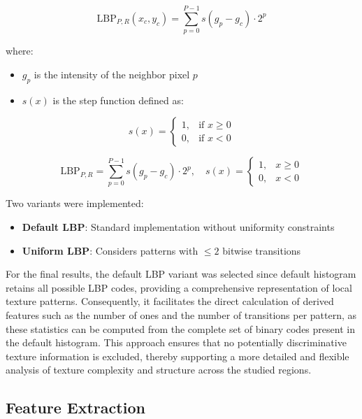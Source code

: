 \documentclass[a4paper,12pt]{report}
\begin{document}
\begin{equation}
\text{LBP}_{P,R}(x_c, y_c) = \sum_{p=0}^{P-1} s(g_p - g_c) \cdot 2^p
\end{equation}

where:
\begin{itemize}
    \item $g_p$ is the intensity of the neighbor pixel $p$
    \item $s(x)$ is the step function defined as:
\end{itemize}

\begin{equation}
s(x) = 
\begin{cases}
1, & \text{if } x \geq 0 \\
0, & \text{if } x < 0
\end{cases}
\end{equation}

\begin{equation}
\text{LBP}_{P,R} = \sum_{p=0}^{P-1} s(g_p - g_c) \cdot 2^p,\quad s(x) = 
\begin{cases}
1, & x \geq 0 \\
0, & x < 0
\end{cases}
\end{equation}

Two variants were implemented:
\begin{itemize}
    \item \textbf{Default LBP}: Standard implementation without uniformity constraints
    \item \textbf{Uniform LBP}: Considers patterns with $\leq 2$ bitwise transitions
\end{itemize}

For the final results, the default LBP variant was selected since default histogram retains all possible LBP codes, providing a comprehensive representation of local texture patterns. Consequently, it facilitates the direct calculation of derived features such as the number of ones and the number of transitions per pattern, as these statistics can be computed from the complete set of binary codes present in the default histogram. This approach ensures that no potentially discriminative texture information is excluded, thereby supporting a more detailed and flexible analysis of texture complexity and structure across the studied regions.

\subsection{Feature Extraction}
\label{subsec:feature_extraction}
\end{document}
